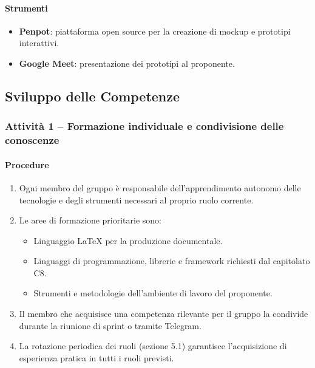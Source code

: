 \documentclass[a4paper, 11pt, oneside]{scrartcl}
\begin{document}
\paragraph{Strumenti}
\begin{itemize}
    \item \textbf{Penpot}: piattaforma open source per la creazione di mockup e prototipi interattivi.
    \item \textbf{Google Meet}: presentazione dei prototipi al proponente.
\end{itemize}

\subsection{Sviluppo delle Competenze}

\subsubsection{Attività 1 – Formazione individuale e condivisione delle conoscenze}

\paragraph{Procedure}
\begin{enumerate}
    \item Ogni membro del gruppo è responsabile dell'apprendimento autonomo delle tecnologie e degli strumenti necessari al proprio ruolo corrente.
    \item Le aree di formazione prioritarie sono:
          \begin{itemize}
              \item Linguaggio \LaTeX{} per la produzione documentale.
              \item Linguaggi di programmazione, librerie e framework richiesti dal capitolato C8.
              \item Strumenti e metodologie dell'ambiente di lavoro del proponente.
          \end{itemize}
    \item Il membro che acquisisce una competenza rilevante per il gruppo la condivide durante la riunione di sprint o tramite Telegram.
    \item La rotazione periodica dei ruoli (sezione 5.1) garantisce l'acquisizione di esperienza pratica in tutti i ruoli previsti.
\end{enumerate}
\end{document}
